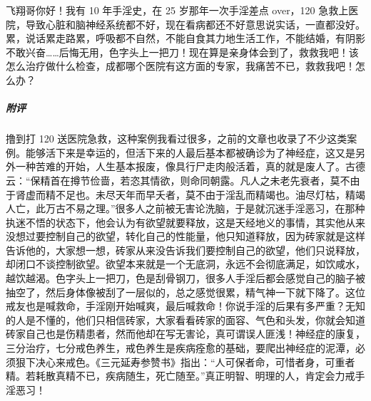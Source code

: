 \begin{case}
    飞翔哥你好！我有 10 年手淫史，在 25 岁那年一次手淫差点 over，120 急救上医院，导致心脏和脑神经系统都不好，现在看病都还不好意思说实话，一直都没好。累，说话累走路累，呼吸都不自然，不能自食其力地生活工作，不能结婚，有阴影不敢兴奋……后悔无用，色字头上一把刀！现在算是亲身体会到了，救救我吧！该怎么治疗做什么检查，成都哪个医院有这方面的专家，我痛苦不已，救救我吧！怎么办？
    \subparagraph{附评} 撸到打 120 送医院急救，这种案例我看过很多，之前的文章也收录了不少这类案例。能够活下来是幸运的，但活下来的人最后基本都被确诊为了神经症，这又是另外一种苦难的开始，人生基本报废，像具行尸走肉般活着，真的就是废人了。古德云：“保精首在撙节俭啬，若恣其情欲，则命同朝露。凡人之未老先衰者，莫不由于肾虚而精不足也。未尽天年而早夭者，莫不由于淫乱而精竭也。油尽灯枯，精竭人亡，此万古不易之理。”很多人之前被无害论洗脑，于是就沉迷手淫恶习，在那种执迷不悟的状态下，他会认为有欲望就要释放，这是天经地义的事情，其实他从来没想过要控制自己的欲望，转化自己的性能量，他只知道释放，因为砖家就是这样告诉他的，大家想一想，砖家从来没告诉我们要控制自己的欲望，他们只说释放，却闭口不谈控制欲望。欲望本来就是一个无底洞，永远不会彻底满足，如饮咸水，越饮越渴。色字头上一把刀，色是刮骨钢刀，很多人手淫后都会感觉自己的脑子被抽空了，然后身体像被刮了一层似的，总之感觉很累，精气神一下就下降了。这位戒友也是喊救命，手淫刚开始喊爽，最后喊救命！你说手淫的后果有多严重？无知的人是不懂的，他们只相信砖家，大家看看砖家的面容、气色和头发，你就会知道砖家自己也是伤精患者，然而他却在写无害论，真可谓误人匪浅！神经症的康复，三分治疗，七分戒色养生，戒色养生是疾病痊愈的基础，要爬出神经症的泥潭，必须狠下决心来戒色。《三元延寿参赞书》指出：“人可保者命，可惜者身，可重者精。若耗散真精不已，疾病随生，死亡随至。”真正明智、明理的人，肯定会力戒手淫恶习！
\end{case}

